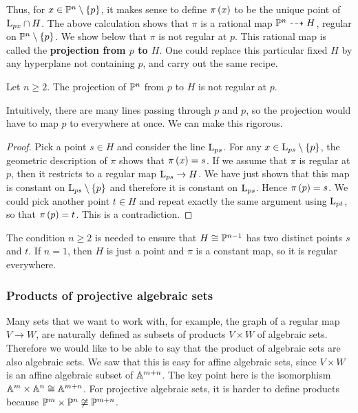 Thus, for $ x \in \PP^n \setminus \cbr{p} $, it makes sense to define $ \pi\br{x} $ to be the unique point of $ \L_{px} \cap H $. The above calculation shows that $ \pi $ is a rational map $ \PP^n \dashrightarrow H $, regular on $ \PP^n \setminus \cbr{p} $. We show below that $ \pi $ is not regular at $ p $. This rational map is called the \textbf{projection from $ p $ to $ H $}. One could replace this particular fixed $ H $ by any hyperplane not containing $ p $, and carry out the same recipe.

\begin{lemma}
Let $ n \ge 2 $. The projection of $ \PP^n $ from $ p $ to $ H $ is not regular at $ p $.
\end{lemma}

Intuitively, there are many lines passing through $ p $ and $ p $, so the projection would have to map $ p $ to everywhere at once. We can make this rigorous.

\begin{proof}
Pick a point $ s \in H $ and consider the line $ \L_{ps} $. For any $ x \in \L_{ps} \setminus \cbr{p} $, the geometric description of $ \pi $ shows that $ \pi\br{x} = s $. If we assume that $ \pi $ is regular at $ p $, then it restricts to a regular map $ \L_{ps} \to H $. We have just shown that this map is constant on $ \L_{ps} \setminus \cbr{p} $ and therefore it is constant on $ \L_{ps} $. Hence $ \pi\br{p} = s $. We could pick another point $ t \in H $ and repeat exactly the same argument using $ \L_{pt} $, so that $ \pi\br{p} = t $. This is a contradiction.
\end{proof}

The condition $ n \ge 2 $ is needed to ensure that $ H \cong \PP^{n - 1} $ has two distinct points $ s $ and $ t $. If $ n = 1 $, then $ H $ is just a point and $ \pi $ is a constant map, so it is regular everywhere.

\subsubsection{Products of projective algebraic sets}

Many sets that we want to work with, for example, the graph of a regular map $ V \to W $, are naturally defined as subsets of products $ V \times W $ of algebraic sets. Therefore we would like to be able to say that the product of algebraic sets are also algebraic sets. We saw that this is easy for affine algebraic sets, since $ V \times W $ is an affine algebraic subset of $ \AA^{m + n} $. The key point here is the isomorphism $ \AA^m \times \AA^n \cong \AA^{m + n} $. For projective algebraic sets, it is harder to define products because $ \PP^m \times \PP^n \not\cong \PP^{m + n} $.

